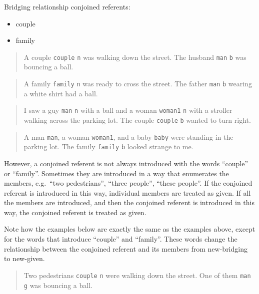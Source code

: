 \documentclass[
]{book}
\providecommand{\tightlist}{%
  \setlength{\itemsep}{0pt}\setlength{\parskip}{0pt}}
\begin{document}
Bridging relationship conjoined referents:

\begin{itemize}
\tightlist
\item
  couple
\item
  family
\end{itemize}

\begin{quote}
A couple \texttt{couple} \texttt{n} was walking down the street.
The husband \texttt{man} \texttt{b} was bouncing a ball.
\end{quote}

\begin{quote}
A family \texttt{family} \texttt{n} was ready to cross the street.
The father \texttt{man} \texttt{b} wearing a white shirt had a ball.
\end{quote}

\begin{quote}
I saw a guy \texttt{man} \texttt{n} with a ball and a woman \texttt{woman1} \texttt{n} with a stroller walking across the parking lot.
The couple \texttt{couple} \texttt{b} wanted to turn right.
\end{quote}

\begin{quote}
A man \texttt{man}, a woman \texttt{woman1}, and a baby \texttt{baby} were standing in the parking lot.
The family \texttt{family} \texttt{b} looked strange to me.
\end{quote}

However, a conjoined referent is not always introduced with the words ``couple'' or ``family''.
Sometimes they are introduced in a way that enumerates the members, e.g.~``two pedestrians'', ``three people'', ``these people''.
If the conjoined referent is introduced in this way, individual members are treated as given.
If all the members are introduced, and then the conjoined referent is introduced in this way, the conjoined referent is treated as given.

Note how the examples below are exactly the same as the examples above, except for the words that introduce ``couple'' and ``family''. These words change the relationship between the conjoined referent and its members from new-bridging to new-given.

\begin{quote}
Two pedestrians \texttt{couple} \texttt{n} were walking down the street.
One of them \texttt{man} \texttt{g} was bouncing a ball.
\end{quote}
\end{document}
